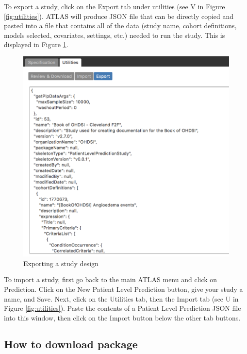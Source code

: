 \documentclass[11pt]{book}
\theoremstyle{definition}
\theoremstyle{definition}
\theoremstyle{definition}
\theoremstyle{remark}
\begin{document}
To export a study, click on the Export tab under utilities (see V in Figure \ref{fig:utilities}). ATLAS will produce JSON file that can be directly copied and pasted into a file that contains all of the data (study name, cohort definitions, models selected, covariates, settings, etc.) needed to run the study. This is displayed in Figure \ref{fig:export}.

\begin{figure}
\includegraphics[width=1\linewidth]{images/PatientLevelPrediction/atlasImplementation/utilities_export} \caption{Exporting a study design}\label{fig:export}
\end{figure}

To import a study, first go back to the main ATLAS menu and click on Prediction. Click on the New Patient Level Prediction button, give your study a name, and Save. Next, click on the Utilities tab, then the Import tab (see U in Figure \ref{fig:utilities}). Paste the contents of a Patient Level Prediction JSON file into this window, then click on the Import button below the other tab buttons.

\hypertarget{how-to-download-package}{%
\subsection{How to download package}\label{how-to-download-package}}
\end{document}
